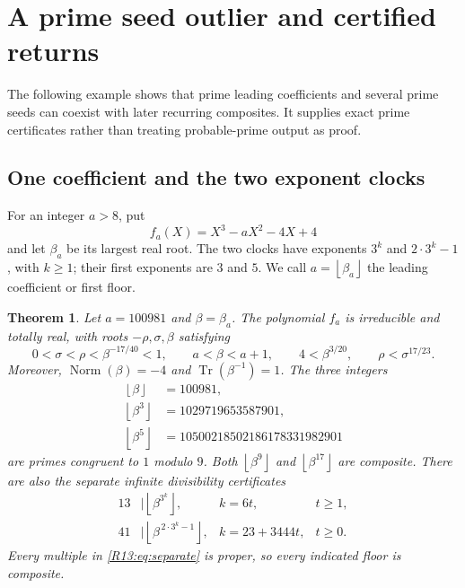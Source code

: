 \documentclass[11pt,a4paper]{article}
\newtheorem{theorem}{Theorem}[section]
\theoremstyle{definition}\newtheorem{definition}[theorem]{Definition}
\theoremstyle{remark}\newtheorem{remark}[theorem]{Remark}
\newcommand{\floor}[1]{\left\lfloor#1\right\rfloor}
\DeclareMathOperator{\Tr}{Tr}\DeclareMathOperator{\tr}{tr}\DeclareMathOperator{\Nm}{N}
\DeclareMathOperator{\Norm}{Norm}\DeclareMathOperator{\ord}{ord}\DeclareMathOperator{\Gal}{Gal}
\begin{document}
\section{A prime seed outlier and certified returns}\label{src:R13}
The following example shows that prime leading coefficients and several prime seeds can coexist with later recurring composites. It supplies exact prime certificates rather than treating probable-prime output as proof.
\medskip
\begingroup




\subsection{One coefficient and the two exponent clocks}

For an integer $a>8$, put
\[
 f_a(X)=X^3-aX^2-4X+4
\]
and let $\beta_a$ be its largest real root.
The two clocks have exponents $3^k$ and $2\cdot3^k-1$, with
$k\ge1$; their first exponents are $3$ and $5$.
We call $a=\floor{\beta_a}$ the leading coefficient or first floor.

\begin{theorem}\label{R13:thm:point}
Let $a=100981$ and $\beta=\beta_a$.
The polynomial $f_a$ is irreducible and totally real, with roots
$-\rho,\sigma,\beta$ satisfying
\begin{equation}\label{R13:eq:rootsbounds}
 0<\sigma<\rho<\beta^{-17/40}<1,\qquad
 a<\beta<a+1,\qquad 4<\beta^{3/20},\qquad
 \rho<\sigma^{17/23}.
\end{equation}
Moreover, $\Norm(\beta)=-4$ and $\Tr(\beta^{-1})=1$.
The three integers
\begin{equation}\label{R13:eq:threeprimes}
 \begin{aligned}
 \floor\beta&=100981,\\
 \floor{\beta^3}&=1029719653587901,\\
 \floor{\beta^5}&=10500218502186178331982901
 \end{aligned}
\end{equation}
are primes congruent to $1$ modulo $9$.
Both $\floor{\beta^9}$ and $\floor{\beta^{17}}$ are composite.
There are also the separate infinite divisibility certificates
\begin{equation}\label{R13:eq:separate}
 \begin{array}{rlll}
 13&\mid\floor{\beta^{3^k}},
     &k=6t,&t\ge1,\\
 41&\mid\floor{\beta^{\,2\cdot3^k-1}},
     &k=23+3444t,&t\ge0.
 \end{array}
\end{equation}
Every multiple in \eqref{R13:eq:separate} is proper, so every indicated
floor is composite.
\end{theorem}
\end{document}
